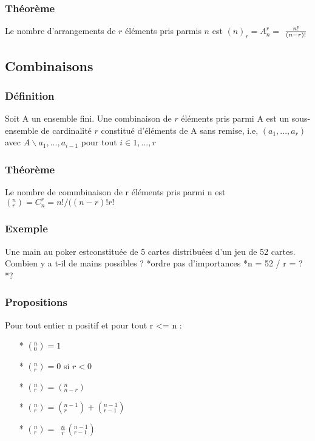\documentclass{article}
\begin{document}
            \subsubsection{Théorème}
                Le nombre d'arrangements de $r$ éléments pris parmis $n$ est $(n)_r = A_{n}^{r} =$ $n!\over(n-r)!$
                
        \subsection{Combinaisons}
            \subsubsection{Définition}
                Soit A un ensemble fini. Une combinaison de $r$ éléments pris parmi A est un sous-ensemble de cardinalité
                $r$ constitué d'éléments de A sans remise, i.e, $(a_1,...,a_r)$ avec $A\backslash {a_1,...,a_{i-1}}$ 
                pour tout $i \in {1,...,r}$
            \subsubsection{Théorème}
                Le nombre de commbinaison de r éléments pris parmi n est $(_r^n) = C_n^r = n!/((n-r)!r!$
            \subsubsection{Exemple}
                Une main au poker estconstituée de 5 cartes distribuées d'un jeu de 52 cartes. Combien y a t-il de mains possibles ?
                *ordre pas d'importances
                *n = 52 / r = ?
                *?
                
            \subsubsection{Propositions}
                Pour tout entier n positif et pour tout r <= n :
                \begin{itemize}
                    \item[*] $(_0^n) = 1$
                    \item[*] $(_r^n) = 0$ si $r < 0$
                    \item[*] $(_r^n) = (_{n-r}^n)$
                    \item[*] $(_r^n) = (_r^{n-1})+ (_{r-1}^{n-1})$
                    \item[*] $(_r^n) =$ $n\over r$$(_{r-1}^{n-1})$ 
                \end{itemize}
                
\end{document}
